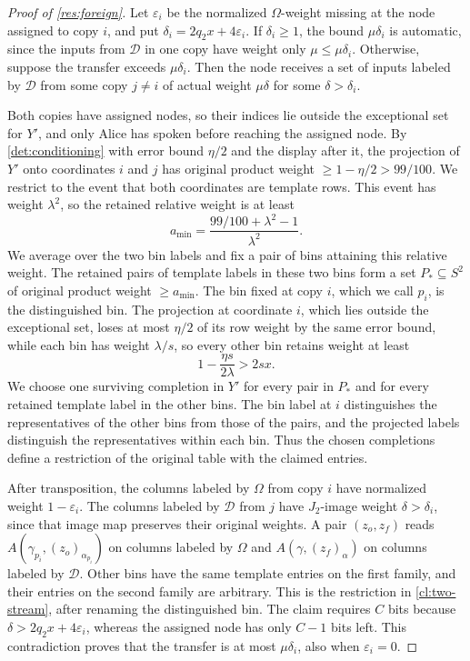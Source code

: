 \documentclass[11pt,letterpaper]{article} \usepackage[utf8]{inputenc}
\theoremstyle{plain} \newtheorem{theorem}{Theorem}[section]
\theoremstyle{definition} \newaliascnt{definition}{theorem}
\begin{document}
\begin{proof}[Proof of \cref{res:foreign}]
\label{proof:res:foreign}
Let $\varepsilon_i$ be the normalized $\Omega$-weight missing at the node assigned to copy $i$, and put
$\delta_i=2q_2x+4\varepsilon_i$. If $\delta_i\ge1$, the bound $\mu\delta_i$ is automatic, since
the inputs from $\mathcal D$ in one copy have weight only $\mu\le\mu\delta_i$. Otherwise, suppose the transfer
exceeds $\mu\delta_i$. Then the node receives a set of inputs labeled by $\mathcal D$ from some copy $j\ne i$ of actual
weight $\mu\delta$ for some $\delta>\delta_i$.

Both copies have assigned nodes, so their indices lie outside the exceptional set for $Y'$, and only Alice has spoken before
reaching the assigned node. By \cref{det:conditioning} with error bound $\eta/2$ and the display
after it, the projection of $Y'$ onto
coordinates $i$ and $j$ has original product weight $\ge1-\eta/2>99/100$.
We restrict to the event that both coordinates are template rows. This event
has weight $\lambda^2$, so the
retained relative weight is at least
\[
a_{\min}=\frac{99/100+\lambda^2-1}{\lambda^2}.
\]
We average over the two bin labels and fix a pair of bins attaining this relative
weight. The retained pairs of template labels in these two bins form a set $P_*\subseteq S^2$ of original
product weight $\ge a_{\min}$. The bin fixed at copy $i$, which we call $p_i$, is the distinguished bin. The
projection at coordinate $i$, which lies outside the exceptional set, loses at most $\eta/2$ of its row weight
by the same error bound, while each bin has weight $\lambda/s$,
so every other
bin retains weight at least
\[
1-\frac{\eta s}{2\lambda}>2sx.
\]
We choose one surviving completion in $Y'$ for every pair in $P_*$ and
for every retained template label in the other bins. The bin label at $i$ distinguishes
the representatives of the other bins from those of the pairs, and the projected labels distinguish the
representatives within each bin. Thus the chosen completions define a
restriction of the original table with the claimed entries.

After transposition, the columns labeled by $\Omega$ from copy $i$ have normalized weight
$1-\varepsilon_i$. The columns labeled by $\mathcal D$ from $j$ have $J_2$-image weight
$\delta>\delta_i$, since that image map preserves their original weights. A pair
$(z_o,z_f)$ reads $A(\gamma_{p_i},(z_o)_{\alpha_{p_i}})$ on columns labeled by $\Omega$ and
$A(\gamma,(z_f)_\alpha)$ on columns labeled by $\mathcal D$. Other bins have the same
template entries on the first family, and their entries on the second family are arbitrary. This is the
restriction in \cref{cl:two-stream}, after renaming the distinguished bin.
The claim requires $C$ bits because $\delta>2q_2x+4\varepsilon_i$, whereas the
assigned node has only $C-1$ bits left. This contradiction proves that the
transfer is at most $\mu\delta_i$, also when $\varepsilon_i=0$.
\end{proof}
\end{document}
